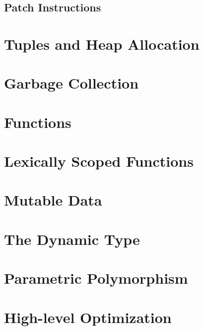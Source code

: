 \documentclass[12pt]{book}
\begin{document}
\section{Patch Instructions}


\chapter{Tuples and Heap Allocation}
\label{ch:tuples}

\chapter{Garbage Collection}
\label{ch:gc}


\chapter{Functions}
\label{ch:functions}


\chapter{Lexically Scoped Functions}
\label{ch:lambdas}


\chapter{Mutable Data}
\label{ch:mutable-data}

\chapter{The Dynamic Type}
\label{ch:type-dynamic}


\chapter{Parametric Polymorphism}
\label{ch:parametric-polymorphism}

\chapter{High-level Optimization}
\label{ch:high-level-optimization}




\end{document}
